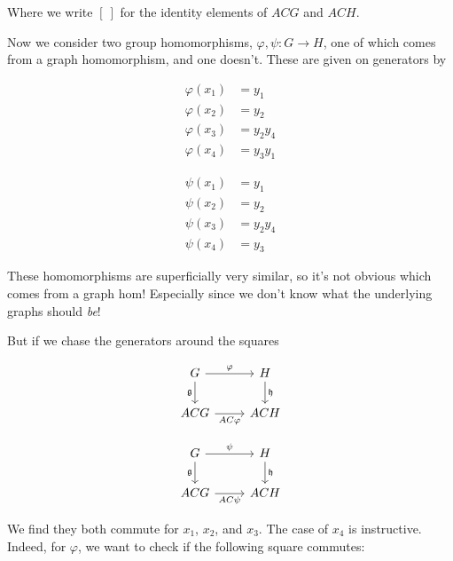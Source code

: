 \documentclass[12pt]{article}
\theoremstyle{definition}
\theoremstyle{theorem}
\begin{document}
Where we write $[ \ ]$ for the identity elements of $ACG$ and $ACH$.

Now we consider two group homomorphisms, $\varphi, \psi : G \to H$, 
one of which comes from a graph homomorphism, and one doesn't. 
These are given on generators by

\noindent\begin{minipage}{.5\linewidth}
\begin{align*}
  \varphi(x_1) &= y_1 \\
  \varphi(x_2) &= y_2 \\
  \varphi(x_3) &= y_2 y_4 \\
  \varphi(x_4) &= y_3 y_1
\end{align*}
\end{minipage}%
\begin{minipage}{.5\linewidth}
\begin{align*}
  \psi(x_1) &= y_1 \\
  \psi(x_2) &= y_2 \\
  \psi(x_3) &= y_2 y_4 \\
  \psi(x_4) &= y_3
\end{align*}
\end{minipage}

These homomorphisms are superficially very similar, so it's not obvious 
which comes from a graph hom! Especially since we don't know what the 
underlying graphs should \emph{be}!

But if we chase the generators around the squares 

\noindent\begin{minipage}{.5\linewidth}
  \[\begin{tikzcd}
	G & H \\
	ACG & ACH
	\arrow["\varphi", from=1-1, to=1-2]
	\arrow["{\mathfrak{g}}"', from=1-1, to=2-1]
	\arrow["{\mathfrak{h}}", from=1-2, to=2-2]
	\arrow["AC\varphi"', from=2-1, to=2-2]
\end{tikzcd}\]
\end{minipage}%
\begin{minipage}{.5\linewidth}
  \[\begin{tikzcd}
	G & H \\
	ACG & ACH
	\arrow["\psi", from=1-1, to=1-2]
	\arrow["{\mathfrak{g}}"', from=1-1, to=2-1]
	\arrow["{\mathfrak{h}}", from=1-2, to=2-2]
	\arrow["AC\psi"', from=2-1, to=2-2]
\end{tikzcd}\]
\end{minipage}

We find they both commute for $x_1$, $x_2$, and $x_3$. The case of 
$x_4$ is instructive. Indeed, for $\varphi$, we want to check if the 
following square commutes:
\end{document}
